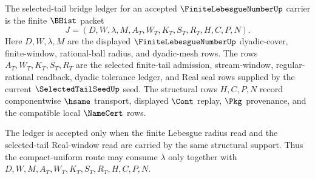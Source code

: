\begin{definition}
\label{def:finite-lebesgue-number-selected-tail-bridge-ledger}
The selected-tail bridge ledger for an accepted $\FiniteLebesgueNumberUp$ carrier is the finite $\BHist$ packet
$$
J=(D,W,\lambda,M,A_T,W_T,K_T,S_T,R_T,H,C,P,N).
$$
Here $D,W,\lambda,M$ are the displayed $\FiniteLebesgueNumberUp$ dyadic-cover, finite-window, rational-ball radius, and dyadic-mesh rows. The rows $A_T,W_T,K_T,S_T,R_T$ are the selected finite-tail admission, stream-window, regular-rational readback, dyadic tolerance ledger, and Real seal rows supplied by the current $\SelectedTailSeedUp$ seed. The structural rows $H,C,P,N$ record componentwise $\hsame$ transport, displayed $\Cont$ replay, $\Pkg$ provenance, and the compatible local $\NameCert$ rows.

The ledger is accepted only when the finite Lebesgue radius read and the selected-tail Real-window read are carried by the same structural support. Thus the compact-uniform route may consume $\lambda$ only together with $D,W,M,A_T,W_T,K_T,S_T,R_T,H,C,P,N$.
\end{definition}

